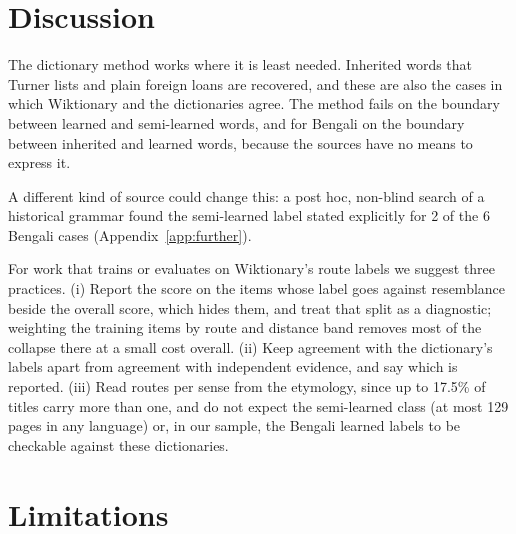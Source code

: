 \documentclass[11pt]{article}
\begin{document}
\section{Discussion}

The dictionary method works where it is least needed. Inherited words that Turner lists and plain foreign loans are recovered, and these are also the cases in which Wiktionary and the dictionaries agree. The method fails on the boundary between learned and semi-learned words, and for Bengali on the boundary between inherited and learned words, because the sources have no means to express it.

A different kind of source could change this: a post hoc, non-blind search of a historical grammar found the semi-learned label stated explicitly for 2 of the 6 Bengali cases (Appendix~\ref{app:further}).

For work that trains or evaluates on Wiktionary's route labels we suggest three practices. (i) Report the score on the items whose label goes against resemblance beside the overall score, which hides them, and treat that split as a diagnostic; weighting the training items by route and distance band removes most of the collapse there at a small cost overall. (ii) Keep agreement with the dictionary's labels apart from agreement with independent evidence, and say which is reported. (iii) Read routes per sense from the etymology, since up to 17.5\% of titles carry more than one, and do not expect the semi-learned class (at most 129 pages in any language) or, in our sample, the Bengali learned labels to be checkable against these dictionaries.

\section*{Limitations}
\end{document}
